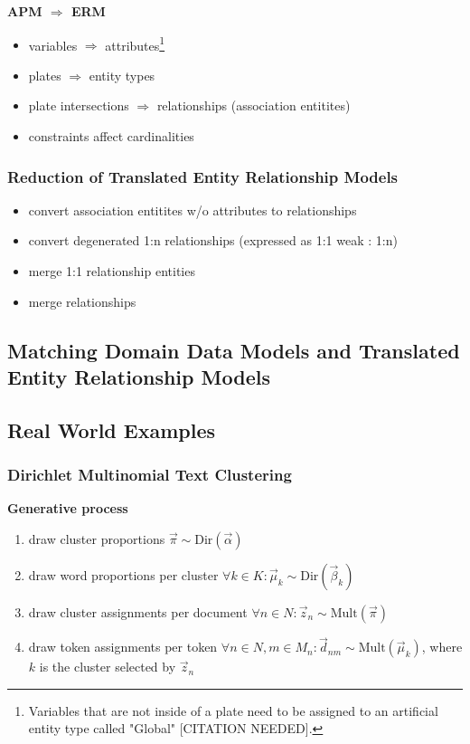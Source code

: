 
\textbf{APM $\Rightarrow$ ERM}
\begin{itemize}
\item variables $\Rightarrow$ attributes\footnote{Variables that are not inside of a plate need to be assigned to an artificial entity type called "Global" [CITATION NEEDED].}
\item plates $\Rightarrow$ entity types
\item plate intersections $\Rightarrow$ relationships (association entitites)
\item constraints affect cardinalities
\end{itemize}

\subsubsection{Reduction of Translated Entity Relationship Models}

\textbf{}
\begin{itemize}
\item convert association entitites w/o attributes to relationships
\item convert degenerated 1:n relationships (expressed as 1:1 weak : 1:n)
\item merge 1:1 relationship entities
\item merge relationships
\end{itemize}

\subsection{Matching Domain Data Models and Translated Entity Relationship Models}

\subsection{Real World Examples}

\subsubsection{Dirichlet Multinomial Text Clustering}

\textbf{Generative process}
\begin{enumerate}
\item draw cluster proportions $\vec \pi \sim \text{Dir}(\vec \alpha)$
\item draw word proportions per cluster $\forall k \in K: \vec \mu_k \sim \text{Dir}(\vec \beta_k)$
\item draw cluster assignments per document $\forall n \in N: \vec z_n \sim \text{Mult}(\vec \pi)$
\item draw token assignments per token $\forall n \in N, m \in M_n: \vec d_{nm} \sim \text{Mult}(\vec \mu_k)$, where $k$ is the cluster selected by $\vec z_n$
\end{enumerate}

